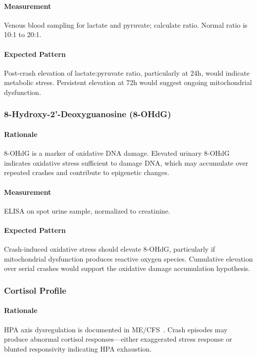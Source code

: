 \paragraph{Measurement}
Venous blood sampling for lactate and pyruvate; calculate ratio. Normal ratio is 10:1 to 20:1.

\paragraph{Expected Pattern}
Post-crash elevation of lactate:pyruvate ratio, particularly at 24h, would indicate metabolic stress. Persistent elevation at 72h would suggest ongoing mitochondrial dysfunction.

\subsubsection{8-Hydroxy-2'-Deoxyguanosine (8-OHdG)}

\paragraph{Rationale}
8-OHdG is a marker of oxidative DNA damage. Elevated urinary 8-OHdG indicates oxidative stress sufficient to damage DNA, which may accumulate over repeated crashes and contribute to epigenetic changes.

\paragraph{Measurement}
ELISA on spot urine sample, normalized to creatinine.

\paragraph{Expected Pattern}
Crash-induced oxidative stress should elevate 8-OHdG, particularly if mitochondrial dysfunction produces reactive oxygen species. Cumulative elevation over serial crashes would support the oxidative damage accumulation hypothesis.

\subsubsection{Cortisol Profile}

\paragraph{Rationale}
HPA axis dysregulation is documented in ME/CFS~\cite{Papadopoulos2012HPA}. Crash episodes may produce abnormal cortisol responses---either exaggerated stress response or blunted responsivity indicating HPA exhaustion.

